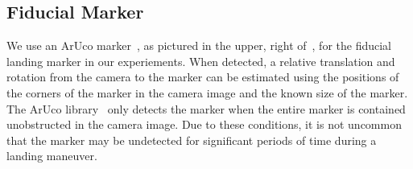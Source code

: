 
\subsection{Fiducial Marker}
We use an ArUco marker~\cite{romero2018speeded}, as pictured in the upper, right
of~, for the fiducial landing marker
in our experiements.
When detected, a relative translation and
rotation from the camera to the marker can be estimated using the positions of
the corners of the marker in the camera image and the known size of the marker. 
The ArUco library~\cite{romero2018speeded} only detects the marker when the entire marker is contained
unobstructed in the camera image. Due to these
conditions, it is not uncommon that the marker may be undetected for significant
periods of time during a landing maneuver.

